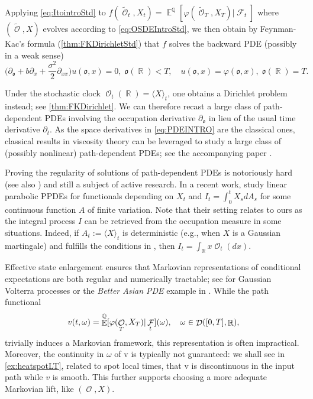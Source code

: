 \documentclass[11pt]{article}
\def\mo{\mathfrak{o}}
\theoremstyle{plain}
\theoremstyle{definition}
\DeclareMathOperator{\E}{\mathbb{E}}
\DeclareMathOperator{\Q}{\mathbb{Q}}
\DeclareMathOperator{\R}{\mathbb{R}}
\DeclareMathOperator{\calD}{\mathcal{D}}
\DeclareMathOperator{\calF}{\mathcal{F}}
\DeclareMathOperator{\calO}{\mathcal{O}}
\begin{document}
Applying \eqref{eq:ItointroStd} to $f(\tilde{\calO}_t,X_t) = \E^{\Q}[\varphi(\tilde{\calO}_T,X_T) | \calF_t]$ where 
$(\tilde{\calO},X)$ evolves according to \eqref{eq:OSDEIntroStd},  
we then obtain by Feynman-Kac's formula (\cref{thm:FKDirichletStd}) that $f$ solves  the  backward  PDE (possibly in a weak sense)  
\begin{equation}\label{eq:PDEINTRO}
    \Big(\partial_{\mo} + b \partial_x + \frac{\sigma^2}{2}\partial_{xx}\Big) u(\mo,x) = 0, \;  \mo(\R) < T, \quad  u(\mo,x) = \varphi(\mo,x), \;   \mo(\R) = T.  
\end{equation}


Under the stochastic  clock $\calO_t(\R) = \langle X \rangle_t$, one obtains a Dirichlet problem instead; see  \cref{thm:FKDirichlet}. 
We can therefore recast a large class of path-dependent PDEs  involving the occupation derivative $\partial_{\mo}$ in lieu of the usual time derivative $\partial_t$.  
As the space derivatives in \eqref{eq:PDEINTRO} are the classical ones, classical results in viscosity theory can be leveraged to  study  a large class of (possibly nonlinear)  path-dependent PDEs; see the accompanying paper \cite{SonerTissotZhang}. 
 
Proving the   regularity of solutions of path-dependent PDEs is notoriously hard  \cite{ZhangEkren2014,PengWang}  (see also \cite[Chapter 11]{ZhangBook}) and still a subject of active research. 
 In a recent work, \citet{BouchardTan} study  linear parabolic PPDEs for functionals depending on  $X_t$ and  $I_t = \int_0^t X_s dA_s$ for some continuous function $A$   of finite variation. Note that their setting  relates to ours as the integral process $I$ can be retrieved from the occupation measure in some situations. Indeed, if    $A_t := \langle X \rangle_t$  is deterministic (e.g., when $X$ is a Gaussian martingale) and  fulfills the conditions in \cite{BouchardTan}, then  $I_t  = \int_{\R} x \calO_t(dx)$. 

Effective state enlargement ensures that Markovian representations of conditional expectations are both regular and numerically tractable; see 
\cite{ViensZhang} for Gaussian Volterra processes or  the \textit{Better Asian PDE} example  in \cite{DupireFITO}.  
While  the  path functional $$\textnormal{v}(t,\omega) = \E^{\Q}[\varphi(\calO_T,X_T) | \calF_t](\omega), \quad \omega \in \calD([0,T], \R), $$ 
  trivially induces a Markovian framework,  this representation is often impractical. Moreover,  the continuity in $\omega$ of \textnormal{v} is typically not guaranteed: we shall see in \cref{ex:heatspotLT}, related to spot local times,  that   \textnormal{v}   is  discontinuous in the input path while  $v$ is smooth. This further supports choosing a more adequate Markovian lift, like  $(\calO,X)$.
\end{document}
